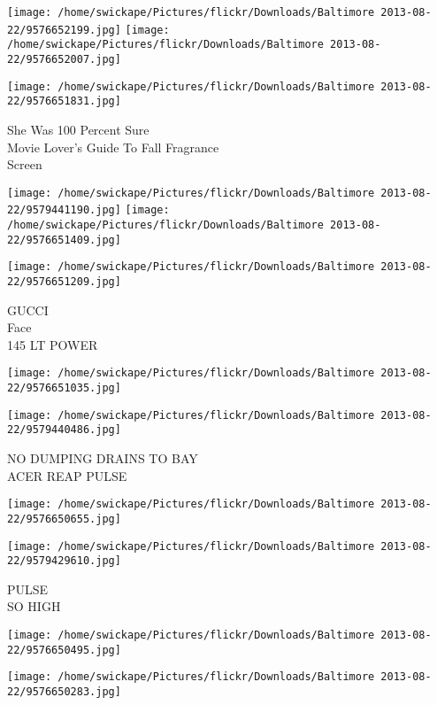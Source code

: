 \documentclass[10pt,letterpaper]{article}
\begin{document}
\texttt{[image: /home/swickape/Pictures/flickr/Downloads/Baltimore 2013-08-22/9576652199.jpg]}
\texttt{[image: /home/swickape/Pictures/flickr/Downloads/Baltimore 2013-08-22/9576652007.jpg]}

\vspace{0.25in}
\texttt{[image: /home/swickape/Pictures/flickr/Downloads/Baltimore 2013-08-22/9576651831.jpg]}

She Was 100 Percent Sure\\
Movie Lover's Guide To Fall Fragrance\\
Screen
\pagebreak

\texttt{[image: /home/swickape/Pictures/flickr/Downloads/Baltimore 2013-08-22/9579441190.jpg]}
\texttt{[image: /home/swickape/Pictures/flickr/Downloads/Baltimore 2013-08-22/9576651409.jpg]}

\texttt{[image: /home/swickape/Pictures/flickr/Downloads/Baltimore 2013-08-22/9576651209.jpg]}

GUCCI\\
Face\\
145 LT POWER
\pagebreak

\texttt{[image: /home/swickape/Pictures/flickr/Downloads/Baltimore 2013-08-22/9576651035.jpg]}

\vspace{0.25in}
\texttt{[image: /home/swickape/Pictures/flickr/Downloads/Baltimore 2013-08-22/9579440486.jpg]}

NO DUMPING DRAINS TO BAY\\
ACER REAP PULSE
\pagebreak

\texttt{[image: /home/swickape/Pictures/flickr/Downloads/Baltimore 2013-08-22/9576650655.jpg]}

\vspace{0.25in}
\texttt{[image: /home/swickape/Pictures/flickr/Downloads/Baltimore 2013-08-22/9579429610.jpg]}

PULSE\\
SO HIGH
\pagebreak

\texttt{[image: /home/swickape/Pictures/flickr/Downloads/Baltimore 2013-08-22/9576650495.jpg]}

\vspace{0.25in}
\texttt{[image: /home/swickape/Pictures/flickr/Downloads/Baltimore 2013-08-22/9576650283.jpg]}
\end{document}
